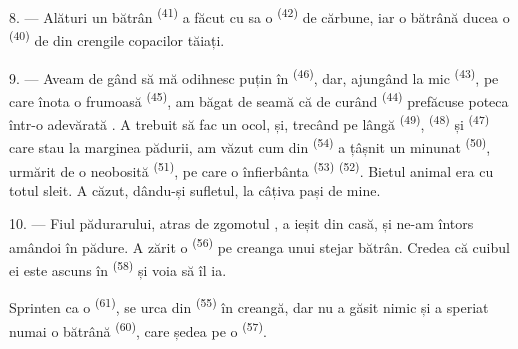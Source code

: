 8. --- Alături un  bătrân \textsuperscript{(41)} a făcut cu
 sa o  \textsuperscript{(42)} de cărbune, iar o
bătrână ducea o  \textsuperscript{(40)} de  din
crengile copacilor tăiați.

\VUsaut{3.0mm}
\VUsaut{3.0mm}

9. --- Aveam de gând să mă odihnesc puțin în 
\textsuperscript{(46)}, dar, ajungând la  mic \textsuperscript{(43)},
pe care înota o  frumoasă \textsuperscript{(45)}, am băgat de seamă
că  de curând \textsuperscript{(44)} prefăcuse poteca într-o
adevărată . A trebuit să fac un ocol, și, trecând pe lângă
 \textsuperscript{(49)},  \textsuperscript{(48)} și
 \textsuperscript{(47)} care stau la marginea pădurii, am văzut cum
din  \textsuperscript{(54)} a țâșnit un  minunat
\textsuperscript{(50)}, urmărit de o  neobosită
\textsuperscript{(51)}, pe care o înfierbânta 
\textsuperscript{(53)}  \textsuperscript{(52)}. Bietul
animal era cu totul sleit. A căzut, dându-și sufletul, la câțiva pași de mine.

10. --- Fiul pădurarului, atras de zgomotul , a ieșit din casă,
și ne-am întors amândoi în pădure. A zărit o 
\textsuperscript{(56)} pe creanga unui stejar bătrân. Credea că cuibul ei este
ascuns în  \textsuperscript{(58)} și voia să îl ia.

Sprinten ca o  \textsuperscript{(61)}, se urca din 
\textsuperscript{(55)} în creangă, dar nu a găsit nimic și a speriat numai o
 bătrână \textsuperscript{(60)}, care ședea pe o 
\textsuperscript{(57)}.
\VUsaut{4.0mm}
\VUfilet{22mm}
